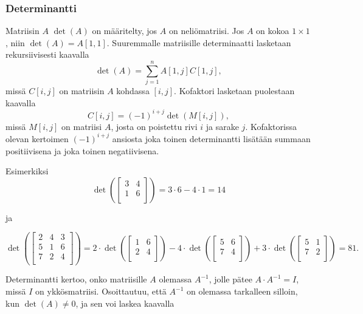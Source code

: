 \subsubsection{Determinantti}


Matriisin $A$  $\det(A)$
on määritelty, jos $A$ on neliömatriisi.
Jos $A$ on kokoa $1 \times 1$,
niin $\det(A)=A[1,1]$.
Suuremmalle matriisille determinaatti lasketaan rekursiivisesti
kaavalla 
\[\det(A)=\sum_{j=1}^n A[1,j] C[1,j],\]
missä $C[i,j]$ on matriisin $A$ 
kohdassa $[i,j]$.
Kofaktori lasketaan puolestaan kaavalla
\[C[i,j] = (-1)^{i+j} \det(M[i,j]),\]
missä $M[i,j]$ on matriisi $A$, josta on poistettu
rivi $i$ ja sarake $j$.
Kofaktorissa olevan kertoimen $(-1)^{i+j}$ ansiosta
joka toinen determinantti
lisätään summaan positiivisena
ja joka toinen negatiivisena.

\begin{samepage}
Esimerkiksi
\[
\det(
 \begin{bmatrix}
  3 & 4 \\
  1 & 6 \\
 \end{bmatrix}
) = 3 \cdot 6 - 4 \cdot 1 = 14 
\]
\end{samepage}

ja

\[
\det(
 \begin{bmatrix}
  2 & 4 & 3 \\
  5 & 1 & 6 \\
  7 & 2 & 4 \\
 \end{bmatrix}
) = 
2 \cdot
\det(
 \begin{bmatrix}
  1 & 6 \\
  2 & 4 \\
 \end{bmatrix}
)
-4 \cdot
\det(
 \begin{bmatrix}
  5 & 6 \\
  7 & 4 \\
 \end{bmatrix}
)
+3 \cdot
\det(
 \begin{bmatrix}
  5 & 1 \\
  7 & 2 \\
 \end{bmatrix}
) = 81.
\]


Determinantti kertoo, onko matriisille
$A$ olemassa 
$A^{-1}$, jolle pätee $A \cdot A^{-1} = I$,
missä $I$ on ykkösmatriisi.
Osoittautuu, että $A^{-1}$ on olemassa
tarkalleen silloin, kun $\det(A) \neq 0$,
ja sen voi laskea kaavalla

